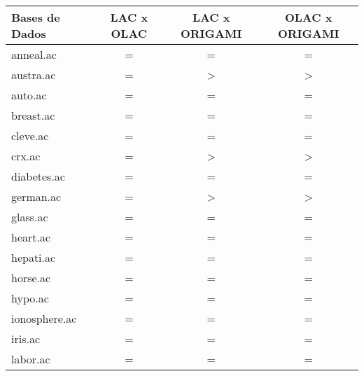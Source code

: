 \begin{table}[htbp]
	\centering
		\renewcommand{\tabcolsep}{1.8mm}
		\begin{tabular}{|l|c|c|c|}
		\hline
		\textbf{Bases de Dados}	& \textbf{LAC x OLAC}	& \textbf{LAC x ORIGAMI}	& \textbf{OLAC x ORIGAMI}	\\
		\hline
		anneal.ac               & =                     & =                     & =                     \\
		\hline
		austra.ac               & =                     & >                     & >                     \\
		\hline
		auto.ac                 & =                     & =                     & =                     \\
		\hline
		breast.ac               & =                     & =                     & =                     \\
		\hline
		cleve.ac                & =                     & =                     & =                     \\
		\hline
		crx.ac                  & =                     & >                     & >                     \\
		\hline
		diabetes.ac             & =                     & =                     & =                     \\
		\hline
		german.ac               & =                     & >                     & >                     \\
		\hline
		glass.ac                & =                     & =                     & =                     \\
		\hline
		heart.ac                & =                     & =                     & =                     \\
		\hline
		hepati.ac               & =                     & =                     & =                     \\
		\hline
		horse.ac                & =                     & =                     & =                     \\
		\hline
		hypo.ac                 & =                     & =                     & =                     \\
		\hline
		ionosphere.ac           & =                     & =                     & =                     \\
		\hline
		iris.ac                 & =                     & =                     & =                     \\
		\hline
		labor.ac                & =                     & =                     & =                     \\

\end{tabular}
\end{table}

